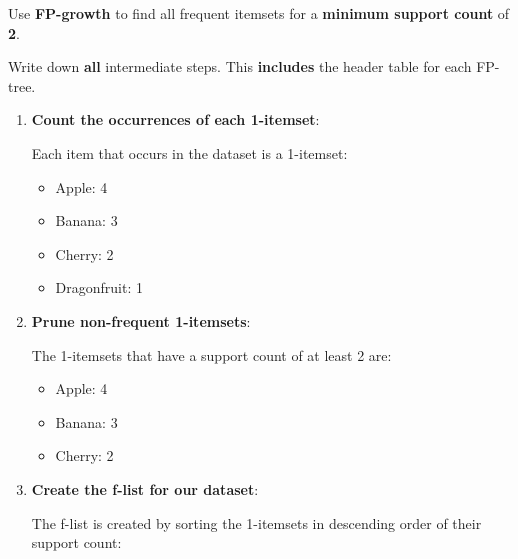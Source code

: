 \documentclass[
english,
smallborders
]{i6prcsht}
\begin{document}
Use \textbf{FP-growth} to find all frequent itemsets for a \textbf{minimum support count} of \textbf{2}.

Write down \textbf{all} intermediate steps. This \textbf{includes} the header table for each FP-tree.

\begin{solution}
	\newcommand{\fptreerootnode}{
		\begin{tikzpicture}
			\node[draw, fill=white, minimum height = 0.65cm, minimum width=2.25cm] at (0,-1) (Label) {$\{\}$};
		\end{tikzpicture}
	}
	
	\newcommand{\fptreenodewithoccurences}[2]{
		\begin{tikzpicture}
			\node[draw, fill=white, minimum height = 0.65cm, minimum width=1.75cm] at (0,-1) (Label) {$#1$};
			\node[draw, fill=white, minimum height = 0.65cm, minimum width=0.5cm, right = 0cm of Label] {$#2$};
		\end{tikzpicture}
	}
	
	\begin{enumerate}
		\item \textbf{Count the occurrences of each 1-itemset}:
		      
		      Each item that occurs in the dataset is a 1-itemset:
		      
		      \begin{itemize}
			      \item Apple: 4
			      \item Banana: 3
			      \item Cherry: 2
			      \item Dragonfruit: 1
		      \end{itemize}
		      
		\item \textbf{Prune non-frequent 1-itemsets}:
		      
		      The 1-itemsets that have a support count of at least 2 are:
		      
		      \begin{itemize}
			      \item Apple: 4
			      \item Banana: 3
			      \item Cherry: 2
		      \end{itemize}
		      
		\item \textbf{Create the f-list for our dataset}:
		      
		      The f-list is created by sorting the 1-itemsets in descending order of their support count:
		      

\end{enumerate}
\end{solution}
\end{document}
